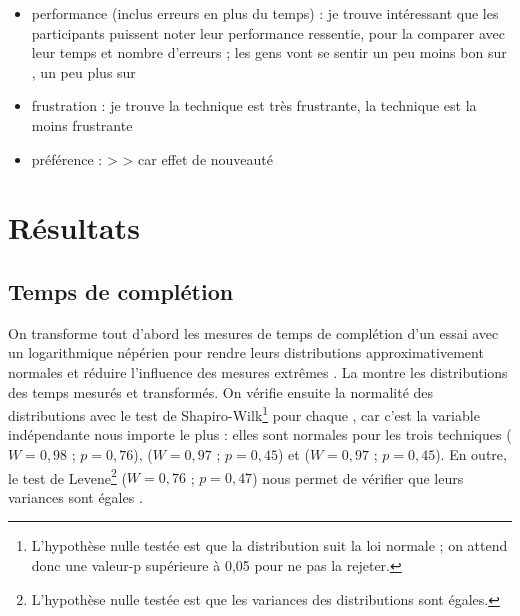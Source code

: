 \begin{itemize}
  \item performance (inclus erreurs en plus du temps) : je trouve intéressant que les participants puissent noter leur performance ressentie, pour la comparer avec leur temps et nombre d'erreurs ; les gens vont se sentir un peu moins bon sur , un peu plus sur 
  \item frustration : je trouve la technique  est très frustrante, la technique  est la moins frustrante
  \item préférence :  >  >  car effet de nouveauté
\end{itemize}


\section{Résultats}
\label{sec:experiment_results}

\subsection{Temps de complétion}
\label{subsec:experiment_results_time}

On transforme tout d'abord les mesures de temps de complétion d'un essai avec un logarithmique népérien pour rendre leurs distributions approximativement normales et réduire l'influence des mesures extrêmes \citep[p. 25]{Dragicevic2016}. La  montre les distributions des temps mesurés et transformés. On vérifie ensuite la normalité des distributions avec le test de Shapiro-Wilk\footnote{L'hypothèse nulle testée est que la distribution suit la loi normale ; on attend donc une valeur-p supérieure à 0,05 pour ne pas la rejeter.} \citep{Wobbrock2016} pour chaque , car c'est la variable indépendante nous importe le plus : elles sont normales pour les trois techniques  ($W=0,98$ ; $p=0,76$),  ($W=0,97$ ; $p=0,45$) et  ($W=0,97$ ; $p=0,45$). En outre, le test de Levene\footnote{L'hypothèse nulle testée est que les variances des distributions sont égales.} ($W=0,76$ ; $p=0,47$) nous permet de vérifier que leurs variances sont égales \citep{Wobbrock2016}.


